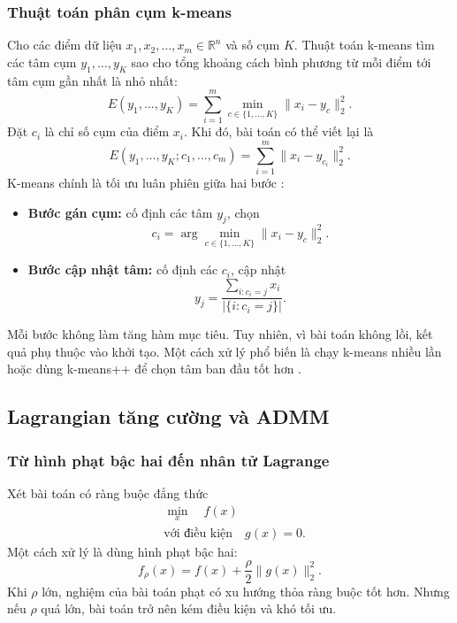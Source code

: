 \subsubsection*{Thuật toán phân cụm k-means}
Cho các điểm dữ liệu $x_1,x_2,\dots,x_m\in\mathbb{R}^{n}$ và số cụm $K$. Thuật toán k-means tìm các tâm cụm $y_1,\dots,y_K$ sao cho tổng khoảng cách bình phương từ mỗi điểm tới tâm cụm gần nhất là nhỏ nhất:
\begin{equation}
    E(y_1,\dots,y_K)
    =
    \sum_{i=1}^{m}
    \min_{c\in\{1,\dots,K\}}\|x_i-y_c\|_2^2.
    \label{eq_kmeans_objective}
\end{equation}
Đặt $c_i$ là chỉ số cụm của điểm $x_i$. Khi đó, bài toán có thể viết lại là
\begin{equation}
    E(y_1,\dots,y_K;c_1,\dots,c_m)
    =
    \sum_{i=1}^{m}\|x_i-y_{c_i}\|_2^2.
    \label{eq_kmeans_expanded}
\end{equation}
K-means chính là tối ưu luân phiên giữa hai bước \cite{Lloyd1982}:
\begin{itemize}
    \item \textbf{Bước gán cụm:} cố định các tâm $y_j$, chọn
    \begin{equation}
        c_i=\arg\min_{c\in\{1,\dots,K\}}\|x_i-y_c\|_2^2.
        \label{eq_kmeans_assignment}
    \end{equation}
    \item \textbf{Bước cập nhật tâm:} cố định các $c_i$, cập nhật
    \begin{equation}
        y_j=
        \frac{\sum_{i:c_i=j}x_i}{|\{i:c_i=j\}|}.
        \label{eq_kmeans_centroid}
    \end{equation}
\end{itemize}
Mỗi bước không làm tăng hàm mục tiêu. Tuy nhiên, vì bài toán không lồi, kết quả phụ thuộc vào khởi tạo. Một cách xử lý phổ biến là chạy k-means nhiều lần hoặc dùng k-means++ để chọn tâm ban đầu tốt hơn \cite{Arthur2007KMeansPP}.

\subsection{Lagrangian tăng cường và ADMM}
\label{SUB_SEC_admm}

\subsubsection*{Từ hình phạt bậc hai đến nhân tử Lagrange}
Xét bài toán có ràng buộc đẳng thức
\begin{equation}
    \begin{aligned}
        &\min_x \quad f(x)\\
        &\text{với điều kiện}\quad g(x)=0.
    \end{aligned}
    \label{eq_eq_constrained_problem}
\end{equation}
Một cách xử lý là dùng hình phạt bậc hai:
\begin{equation}
    f_{\rho}(x)=f(x)+\frac{\rho}{2}\|g(x)\|_2^2.
    \label{eq_quadratic_penalty}
\end{equation}
Khi $\rho$ lớn, nghiệm của bài toán phạt có xu hướng thỏa ràng buộc tốt hơn. Nhưng nếu $\rho$ quá lớn, bài toán trở nên kém điều kiện và khó tối ưu.
\medskip

